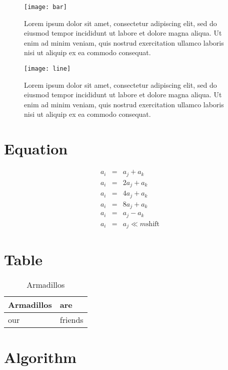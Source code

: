 \begin{figure}	
	\label{fig:sample-bar}
	\centering
	\texttt{[image: bar]}
	\caption{Lorem ipsum dolor sit amet, consectetur adipiscing elit, sed do eiusmod tempor incididunt ut labore et dolore magna aliqua. Ut enim ad minim veniam, quis nostrud exercitation ullamco laboris nisi ut aliquip ex ea commodo consequat.}
\end{figure}

\begin{figure}	
	\label{fig:sample-line}
	\centering
	\texttt{[image: line]}
	\caption{Lorem ipsum dolor sit amet, consectetur adipiscing elit, sed do eiusmod tempor incididunt ut labore et dolore magna aliqua. Ut enim ad minim veniam, quis nostrud exercitation ullamco laboris nisi ut aliquip ex ea commodo consequat.}
\end{figure}

\section*{Equation}


\begin{eqnarray*}
	a_i & = & a_j + a_k \\
	a_i & = & 2a_j + a_k \\
	a_i & = & 4a_j + a_k \\
	a_i & = & 8a_j + a_k \\
	a_i & = & a_j - a_k \\
	a_i & = & a_j \ll m \mbox{shift}
\end{eqnarray*}


\section*{Table}

\begin{table}
	\caption{Armadillos}
	\label{arm:table}
	\begin{center}
		\begin{tabular}{||l|l||}\hline
			Armadillos & are \\\hline
			our	   & friends \\\hline
		\end{tabular}
	\end{center}
\end{table}

\section*{Algorithm}

